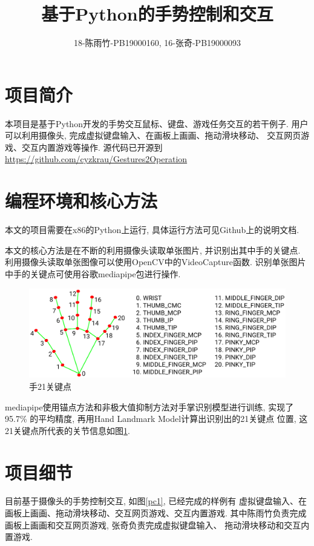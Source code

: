 \documentclass[lang=cn,11pt,a4paper]{elegantpaper}
\title{基于Python的手势控制和交互}
\author{18-陈雨竹-PB19000160, 16-张奇-PB19000093}
\institute{USTC}
\date{\zhtoday}
\begin{document}
\maketitle
\begin{abstract}
\end{abstract}

\section{项目简介}

本项目是基于Python开发的手势交互鼠标、键盘、游戏任务交互的若干例子. 
用户可以利用摄像头, 完成虚拟键盘输入、在画板上画画、拖动滑块移动、
交互网页游戏、交互内置游戏等操作. 源代码已开源到
\href{https://github.com/cyzkrau/Gestures2Operation}
{https://github.com/cyzkrau/Gestures2Operation}

\section{编程环境和核心方法}

本文的项目需要在x86的Python上运行, 具体运行方法可见Github上的说明文档. 

本文的核心方法是在不断的利用摄像头读取单张图片, 并识别出其中手的关键点. 
利用摄像头读取单张图像可以使用OpenCV中的VideoCapture函数. 
识别单张图片中手的关键点可使用谷歌mediapipe包进行操作. 

\begin{figure}[htb]
  \centering
  \includegraphics[width=.8\textwidth]{imgs/hand_landmarks.png}
  \caption{手21关键点\label{ldmk}}
\end{figure}

mediapipe使用锚点方法和非极大值抑制方法对手掌识别模型进行训练, 
实现了 95.7\% 的平均精度, 再用Hand Landmark Model计算出识别出的21关键点
位置, 这21关键点所代表的关节信息如图\ref{ldmk}. 

\section{项目细节}
目前基于摄像头的手势控制交互, 如图\ref{pc1}, 已经完成的样例有
虚拟键盘输入、在画板上画画、拖动滑块移动、交互网页游戏、交互内置游戏. 
其中陈雨竹负责完成画板上画画和交互网页游戏, 张奇负责完成虚拟键盘输入、
拖动滑块移动和交互内置游戏. 
\end{document}
